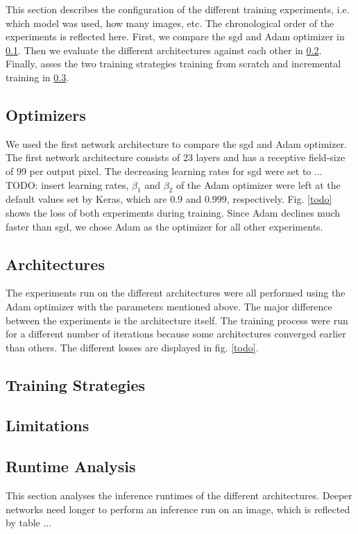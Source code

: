 This section describes the configuration of the different training experiments, i.e. which model was used, how many images, etc. The chronological order of the experiments is reflected here. First, we compare the \gls{sgd} and Adam optimizer in \ref{subsection:optimizers}. Then we evaluate the different architectures against each other in \ref{subsection:architectures}. Finally, asses the two training strategies training from scratch and incremental training in \ref{subsection:training_strategies}.

\subsection{Optimizers} \label{subsection:optimizers}

We used the first network architecture to compare the \gls{sgd} and Adam optimizer. The first network architecture consists of 23 layers and has a receptive field-size of 99 per output pixel. The decreasing learning rates for \gls{sgd} were set to ... TODO: insert learning rates, $\beta_1$ and $\beta_2$ of the Adam optimizer were left at the default values set by Keras, which are $0.9$ and $0.999$, respectively. Fig. \ref{todo} shows the loss of both experiments during training. Since Adam declines much faster than \gls{sgd}, we chose Adam as the optimizer for all other experiments.

\subsection{Architectures} \label{subsection:architectures}

The experiments run on the different architectures were all performed using the Adam optimizer with the parameters mentioned above. The major difference between the experiments is the architecture itself. The training process were run for a different number of iterations because some architectures converged earlier than others. The different losses are displayed in fig. \ref{todo}.

\subsection{Training Strategies} \label{subsection:training_strategies}


\subsection{Limitations}


\subsection{Runtime Analysis}

This section analyses the inference runtimes of the different architectures. Deeper networks need longer to perform an inference run on an image, which is reflected by table ...